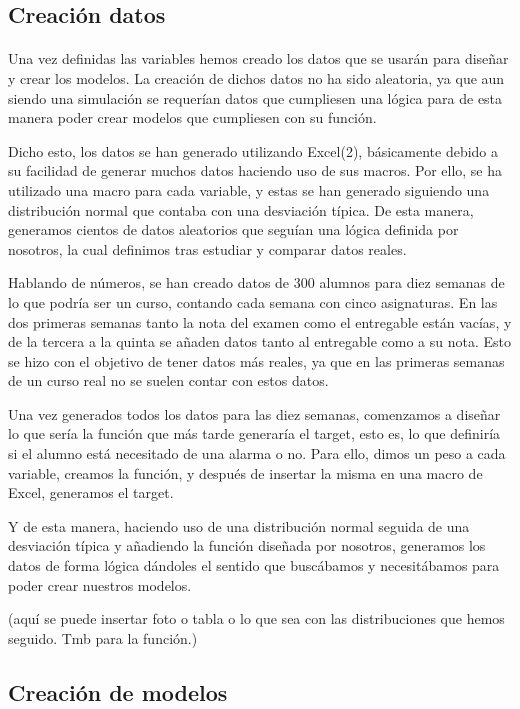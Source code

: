 \subsection{Creación datos}
\paragraph{}
Una vez definidas las variables hemos creado los datos que se usarán
para diseñar y crear los modelos. La creación de dichos datos no ha
sido aleatoria, ya que aun siendo una simulación se requerían datos
que cumpliesen una lógica para de esta manera poder crear modelos que
cumpliesen con su función.

Dicho esto, los datos se han generado utilizando Excel(2), básicamente
debido a su facilidad de generar muchos datos haciendo uso de sus
macros. Por ello, se ha utilizado una macro para cada variable, y
estas se han generado siguiendo una distribución normal que contaba
con una desviación típica. De esta manera, generamos cientos de datos
aleatorios que seguían una lógica definida por nosotros, la cual
definimos tras estudiar y comparar datos reales.

Hablando de números, se han creado datos de 300 alumnos para diez
semanas de lo que podría ser un curso, contando cada semana con cinco
asignaturas. En las dos primeras semanas tanto la nota del examen como
el entregable están vacías, y de la tercera a la quinta se añaden
datos tanto al entregable como a su nota. Esto se hizo con el objetivo
de tener datos más reales, ya que en las primeras semanas de un curso
real no se suelen contar con estos datos.

Una vez generados todos los datos para las diez semanas, comenzamos a
diseñar lo que sería la función que más tarde generaría el target,
esto es, lo que definiría si el alumno está necesitado de una alarma o
no. Para ello, dimos un peso a cada variable, creamos la función, y
después de insertar la misma en una macro de Excel, generamos el
target.

Y de esta manera, haciendo uso de una distribución normal seguida de
una desviación típica y añadiendo la función diseñada por nosotros,
generamos los datos de forma lógica dándoles el sentido que buscábamos
y necesitábamos para poder crear nuestros modelos.

(aquí se puede insertar foto o tabla o lo que sea con las
distribuciones que hemos seguido. Tmb para la función.)


\subsection{Creación de modelos}
